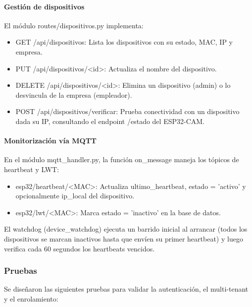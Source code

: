 \paragraph{Gestión de dispositivos}

El módulo routes/dispositivos.py implementa:

\begin{itemize}
    \item GET /api/dispositivos: Lista los dispositivos con su estado, MAC, IP y empresa.
    \item PUT /api/dispositivos/<id>: Actualiza el nombre del dispositivo.
    \item DELETE /api/dispositivos/<id>: Elimina un dispositivo (admin) o lo desvincula de la empresa (empleador).
    \item POST /api/dispositivos/verificar: Prueba conectividad con un dispositivo dada su IP, consultando el endpoint /estado del ESP32-CAM.
\end{itemize}

\paragraph{Monitorización vía MQTT}

En el módulo mqtt\_handler.py, la función on\_message maneja los tópicos de heartbeat y LWT:

\begin{itemize}
    \item esp32/heartbeat/<MAC>: Actualiza ultimo\_heartbeat, estado = 'activo' y opcionalmente ip\_local del dispositivo.
    \item esp32/lwt/<MAC>: Marca estado = 'inactivo' en la base de datos.
\end{itemize}

El watchdog (device\_watchdog) ejecuta un barrido inicial al arrancar (todos los dispositivos se marcan inactivos hasta que envíen su primer heartbeat) y luego verifica cada 60 segundos los heartbeats vencidos.

\subsubsection{Pruebas}

Se diseñaron las siguientes pruebas para validar la autenticación, el multi-tenant y el enrolamiento:

